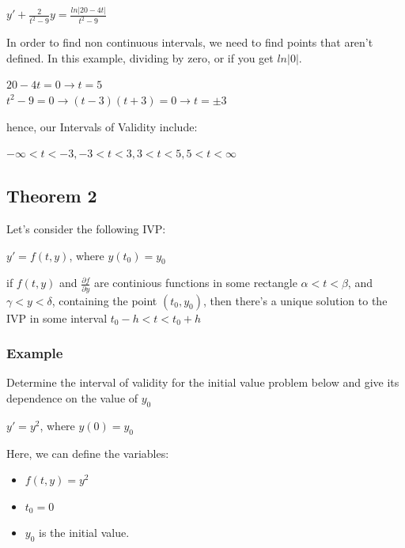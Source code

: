 \documentclass{article}
\begin{document}
\begin{center}
    $y' + \frac{2}{t^2 - 9} y = \frac{ln|20 - 4t|}{t^2 - 9}$
\end{center}

In order to find non continuous intervals, we need to find points that aren't defined. In this example, dividing by zero, or if you get $ln|0|$.

\begin{center}
    $20 - 4t = 0 \rightarrow t = 5$ \\
    $t^2 - 9 = 0 \rightarrow (t - 3)(t + 3) = 0 \rightarrow t = \pm 3$
\end{center}

hence, our Intervals of Validity include:

\begin{center}
    $-\infty < t < -3, -3 < t < 3, 3 < t <  5, 5 < t < \infty$
\end{center}

\subsection{Theorem 2}

Let's consider the following IVP:

\begin{center}
    $y' = f(t,y)$, where $y(t_0) = y_0$
\end{center}

if $f(t,y)$ and $\frac{\partial f}{\partial y}$ are continious functions in some rectangle $\alpha < t < \beta$, and $\gamma  < y < \delta$, containing the point $(t_0,y_0)$, then there's a unique solution to the IVP in some interval $t_0 - h < t < t_0 + h$

\subsubsection{Example}

Determine the interval of validity for the initial value problem below and give its dependence on the value of $y_0$

\begin{center}
    $y' = y^2$, where $y(0) = y_0$
\end{center}

Here, we can define the variables:

\begin{itemize}
    \item $f(t,y) = y^2$
    \item $t_0 = 0$
    \item $y_0$ is the initial value.
\end{itemize}
\end{document}
